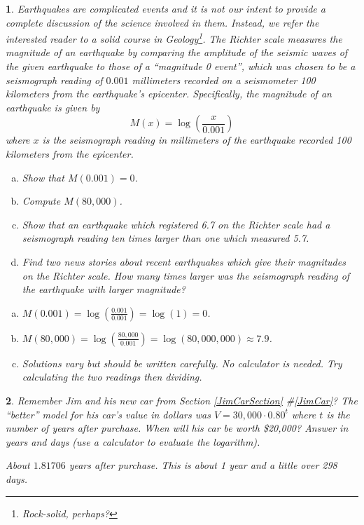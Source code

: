 \documentclass{amsbook}
\newcommand{\ssp}{\begin{enumerate}[(a), leftmargin=*]}
\newcommand{\esp}{\end{enumerate}}
\newtheorem{exc}{}
\newenvironment{ex}{\begin{exc}\normalfont}{\end{exc}}
\numberwithin{section}{chapter}
\numberwithin{equation}{chapter}
\begin{document}
\begin{ex}
	 Earthquakes are complicated events and it is not our intent to provide a complete discussion of the science involved in them.  Instead, we refer the interested reader to a solid course in Geology\footnote{Rock-solid, perhaps?}. The Richter scale measures the magnitude of an earthquake by comparing the amplitude of the seismic waves of the given earthquake to those of a ``magnitude 0 event'', which was chosen to be a seismograph reading of $0.001$ millimeters recorded on a seismometer 100 kilometers from the earthquake's epicenter.  Specifically, the magnitude of an earthquake is given by \[M(x) = \log \left(\dfrac{x}{0.001}\right)\] where $x$ is the seismograph reading in millimeters of the earthquake recorded 100 kilometers from the epicenter.  
	\ssp
	\item Show that $M(0.001) = 0$.
	\item Compute $M(80,000)$.
	\item Show that an earthquake which registered 6.7 on the Richter scale had a seismograph reading ten times larger than one which measured 5.7.
	\item Find two news stories about recent earthquakes which give their magnitudes on the Richter scale.  How many times larger was the seismograph reading of the earthquake with larger magnitude?
	\esp
	\begin{sol}
		\ssp
		\item $M(0.001) = \log \left(\frac{0.001}{0.001} \right) = \log(1) = 0$.
		\item $M(80,000) = \log \left(\frac{80,000}{0.001} \right) = \log(80,000,000) \approx 7.9$.
		\item Solutions vary but should be written carefully. No calculator is needed. Try calculating the two readings then dividing.
		\esp
	\end{sol}
\end{ex}

\begin{ex}
	Remember Jim and his new car from Section \ref{JimCarSection} \#\ref{JimCar}? The ``better'' model for his car's value in dollars was $V = 30,000\cdot 0.80^t$ where $t$ is the number of years after purchase. When will his car be worth \$20,000? Answer in years and days (use a calculator to evaluate the logarithm).
	\begin{sol}
		About $1.81706$ years after purchase. This is about 1 year and a little over 298 days.
	\end{sol}
\end{ex}
\end{document}
